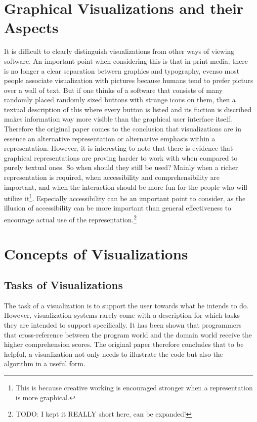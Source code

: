 \documentclass[11pt, a4paper, ngerman, twoside]{article}
\theoremstyle{plain}\newtheorem{Lemma}{Lemma}
\theoremstyle{plain}\newtheorem{Satz}[Lemma]{Satz}
\theoremstyle{definition}\newtheorem{Definition}[Lemma]{Definition}
\theoremstyle{definition}\newtheorem*{Beispiel}{Beispiel}
\theoremstyle{remark}\newtheorem*{Bemerkung}{Bemerkung}
\begin{document}
\section{Graphical Visualizations and their Aspects}
\label{graphical}

It is difficult to clearly distinguish visualizations from other ways of viewing software. An important point when considering this is that in print media, there is no longer a clear separation between graphics and typography, evenso most people associate visualization with pictures because humans tend to prefer picturs over a wall of text. But if one thinks of a software that consists of many randomly placed randomly sized buttons with strange icons on them, then a textual description of this where every button is listed and its fuction is discribed makes information way more visible than the graphical user interface itself. Therefore the original paper comes to the conclusion that visualizations are in essence an alternative representation or alternative emphasis within a representation. However, it is interesting to note that there is evidence that graphical representations are proving harder to work with when compared to purely textual ones. So when should they still be used? Mainly when a richer representation is required, when accessibility and comprehensibility are important, and when the interaction should be more fun for the people who will utilize it\footnote{This is because creative working is encouraged stronger when a representation is more graphical.}. Especially accessibility can be an important point to consider, as the illusion of accessibility can be more important than general effectiveness to encourage actual use of the representation.\footnote{TODO: I kept it REALLY short here, can be expanded!}

\section{Concepts of Visualizations}

\subsection{Tasks of Visualizations}

The task of a visualization is to support the user towards what he intends to do. However, visualization systems rarely come with a description for which tasks they are intended to support specifically. It has been shown that programmers that cross-reference between the program world and the domain world receive the higher comprehension scores\cite{penn}. The original paper therefore concludes that to be helpful, a visualization not only needs to illustrate the code but also the algorithm in a useful form.
\end{document}
